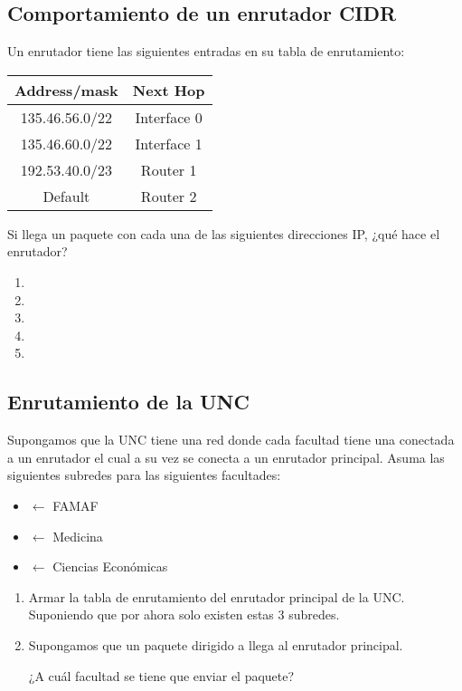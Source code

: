\documentclass[12pt]{report}
\begin{document}
\begin{exer}
\subsection{Comportamiento de un enrutador CIDR \sthree}
 Un enrutador tiene las siguientes entradas  en su tabla de enrutamiento:\\

\begin{center}
\begin{tabular}{| c | c |}
 \hline
 Address/mask & Next Hop \\
 \hline \hline
 135.46.56.0/22 & Interface 0 \\
 \hline
 135.46.60.0/22 & Interface 1 \\
 \hline
 192.53.40.0/23 & Router 1 \\
 \hline
 Default & Router 2 \\
 \hline
\end{tabular}
\end{center}

Si llega un paquete con cada una de las siguientes direcciones IP, ¿qué hace el enrutador?

\begin{enumerate}
\item {}
\item {}
\item {}
\item {}
\item {}
\end{enumerate}
\end{exer}

\begin{exer}
\subsection{Enrutamiento de la UNC \sfour}
Supongamos que la UNC tiene una red donde cada facultad tiene una  conectada a un enrutador el cual a su vez se conecta a un enrutador principal. Asuma las siguientes subredes para las siguientes facultades:

\begin{itemize}
\item {} $\leftarrow$ FAMAF
\item {} $\leftarrow$ Medicina
\item {} $\leftarrow$ Ciencias Económicas
\end{itemize}

\begin{enumerate}
\item Armar la tabla de enrutamiento del enrutador principal de la UNC. Suponiendo que
por ahora solo existen estas 3 subredes.
\item Supongamos que un paquete dirigido a  llega al enrutador principal. 

¿A cuál facultad se tiene que enviar el paquete?
\end{enumerate}
\end{exer}
\end{document}
